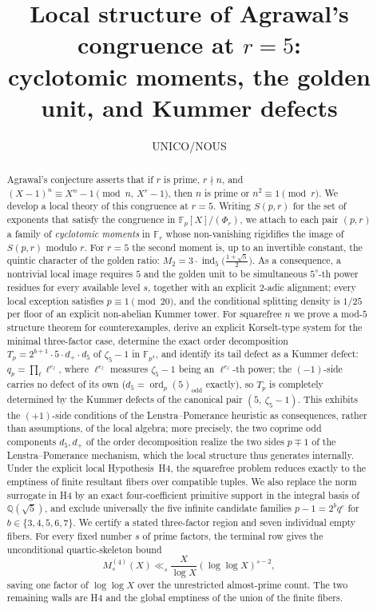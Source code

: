\documentclass[11pt]{amsart}
\title[Local structure of Agrawal's congruence at $r=5$]{Local structure of Agrawal's congruence at $r = 5$:\\ cyclotomic moments, the golden unit, and Kummer defects}
\author{UNICO/NOUS}
\theoremstyle{definition}
\theoremstyle{remark}
\newcommand{\F}{\mathbb{F}}
\newcommand{\Q}{\mathbb{Q}}
\newcommand{\ord}{\operatorname{ord}}
\newcommand{\ind}{\operatorname{ind}}
\begin{document}
\begin{abstract}
Agrawal's conjecture asserts that if $r$ is prime, $r \nmid n$, and
$(X-1)^n \equiv X^n - 1 \pmod{n,\, X^r-1}$, then $n$ is prime or
$n^2 \equiv 1 \pmod r$. We develop a local theory of this congruence
at $r=5$. Writing $S(p,r)$ for the set of exponents that satisfy the
congruence in $\F_p[X]/(\Phi_r)$, we attach to each pair $(p,r)$ a family of
\emph{cyclotomic moments} in $\F_r$ whose non-vanishing rigidifies the image
of $S(p,r)$ modulo $r$. For $r = 5$ the second moment is, up to an invertible
constant, the quintic character of the golden ratio: $M_2 = 3\cdot
\ind_5\!\big(\tfrac{1+\sqrt5}{2}\big)$. As a consequence, a nontrivial local
image requires $5$ and the golden unit to be simultaneous $5^s$-th power
residues for every available level $s$, together with an explicit $2$-adic
alignment; every local exception satisfies $p \equiv 1 \pmod{20}$, and the
conditional splitting density is $1/25$ per floor of an explicit
non-abelian Kummer tower. For squarefree $n$ we prove a mod-$5$ structure
theorem for counterexamples, derive an explicit Korselt-type system for the
minimal three-factor case, determine the exact order decomposition
$T_p = 2^{b+1}\cdot 5\cdot d_+\cdot d_5$ of $\zeta_5-1$ in $\F_{p^4}$, and
identify its tail defect as a Kummer defect: $q_p = \prod_\ell \ell^{e_\ell}$,
where $\ell^{e_\ell}$ measures $\zeta_5-1$ being an $\ell^{e_\ell}$-th power;
the $(-1)$-side carries no defect of its own
($d_5 = \ord_p(5)_{\mathrm{odd}}$ exactly), so $T_p$ is completely
determined by the Kummer defects of the canonical pair $(5,\ \zeta_5-1)$.
This exhibits the $(+1)$-side conditions of the Lenstra--Pomerance heuristic
as consequences, rather than assumptions, of the local algebra; more
precisely, the two coprime odd components $d_5, d_+$ of the order
decomposition realize the two sides $p \mp 1$ of the Lenstra--Pomerance
mechanism, which the local structure thus generates internally. Under the
explicit local Hypothesis~H4, the squarefree problem reduces exactly to
the emptiness of finite resultant fibers over compatible tuples. We also
replace the norm surrogate in H4 by an exact four-coefficient primitive
support in the integral basis of $\Q(\sqrt5)$, and exclude universally the
five infinite candidate families
$p-1=2^bq^e$ for $b\in\{3,4,5,6,7\}$. We certify
a stated three-factor region and seven individual empty fibers. For every
fixed number $s$ of prime factors, the terminal row gives the unconditional
quartic-skeleton bound
\[
M_s^{(4)}(X)\ll_s
\frac{X}{\log X}(\log\log X)^{s-2},
\]
saving one factor of $\log\log X$ over the unrestricted almost-prime count.
The two remaining walls are H4 and the global emptiness of the union of the
finite fibers.
\end{abstract}
\end{document}
